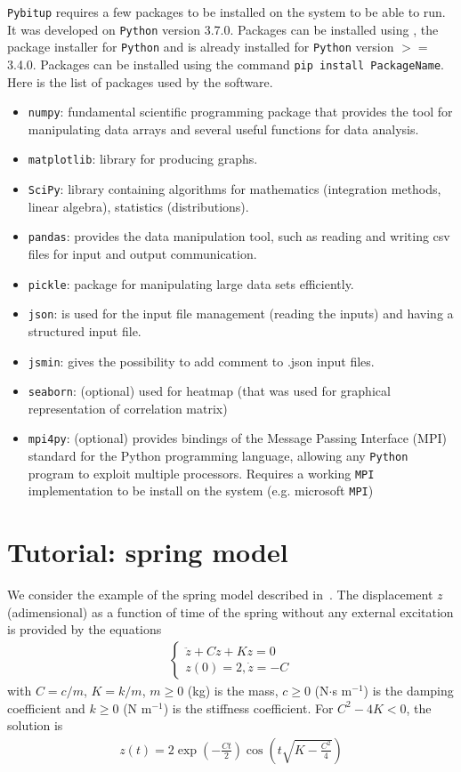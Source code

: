 \documentclass[a4paper,11pt]{article}
\begin{document}
\texttt{Pybitup} requires a few packages to be installed on the system to be able to run. It was developed on \texttt{Python} version 3.7.0. Packages can be installed using ,  the package installer for \texttt{Python} and is already installed for \texttt{Python} version $>=$ 3.4.0. Packages can be installed using the command \texttt{pip install PackageName}. Here is the list of packages used by the software. 
\begin{itemize}
\item \texttt{numpy}: fundamental scientific programming package that provides the tool for manipulating data arrays and several useful functions for data analysis. 
\item \texttt{matplotlib}: library for producing graphs. 
\item \texttt{SciPy}: library containing algorithms for mathematics (integration methods, linear algebra), statistics (distributions). 
\item \texttt{pandas}: provides the data manipulation tool, such as reading and writing csv files for input and output communication. 
\item \texttt{pickle}: package for manipulating large data sets efficiently.  
\item \texttt{json}: is used for the input file management (reading the inputs) and having a structured input file. 
\item \texttt{jsmin}: gives the possibility to add comment to .json input files. 
\item \texttt{seaborn}: (optional) used for heatmap (that was used for graphical representation of correlation matrix) 
\item \texttt{mpi4py}: (optional) provides bindings of the Message Passing Interface (MPI) standard for the Python programming language, allowing any \texttt{Python} program to exploit multiple processors. Requires a working \texttt{MPI} implementation to be install on the system (e.g. microsoft \texttt{MPI}) 
\end{itemize} 


\section{Tutorial: spring model} 

We consider the example of the spring model described in~\cite{smith:14book}. The displacement $z$ (adimensional) as a function of time of the spring without any external excitation is provided by the equations 
\begin{align}
\begin{cases}
 \ddot{z} + C \dot{z} + K z = 0 \\ 
z(0) = 2, \dot{z} = - C 
\end{cases}
\end{align}
with $C = c/m$, $K = k/m$, $m \ge 0$ (kg) is the mass, $c \ge 0$ (N$\cdot$s m$^{-1}$) is the damping coefficient and $k \ge 0$ (N m$^{-1}$) is the stiffness coefficient. For $C^2 - 4K < 0$, the solution is 
\begin{align}
z(t) = 2 \exp\left(- \frac{C t}{2}\right) \cos \left( t \sqrt{K - \frac{C^2}{4}} \right) 
\label{eq:sprinModelSol}
\end{align} 
\end{document}
